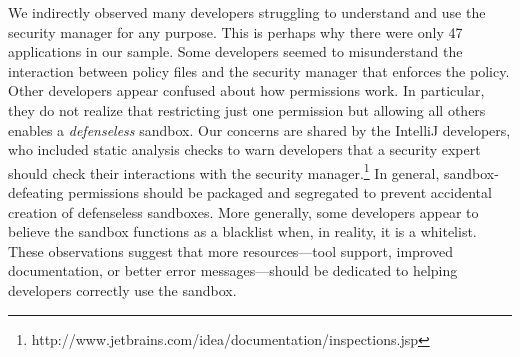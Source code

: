 \documentclass{sig-alternate}
\begin{document}
We indirectly observed many developers struggling to understand and
use the security manager for any purpose. This is perhaps why there
were only 47 applications in our sample. Some developers seemed to
misunderstand the interaction between policy files and the security
manager that enforces the policy. Other developers appear confused
about how permissions work. In particular, they do not realize that
restricting just one permission but allowing all others enables a
\emph{defenseless} sandbox. Our concerns are shared by the IntelliJ developers, who included static analysis checks to warn developers that a security expert should check their interactions with the security manager.\footnote{http://www.jetbrains.com/idea/documentation/inspections.jsp%
} In general, sandbox-defeating permissions
should be packaged and segregated to prevent accidental creation of
defenseless sandboxes. More generally, some developers appear to believe
the sandbox functions as a blacklist when, in reality, it is a whitelist.
These observations suggest that more resources---tool support, improved
documentation, or better error messages---should be dedicated to helping
developers correctly use the sandbox. 



\end{document}
